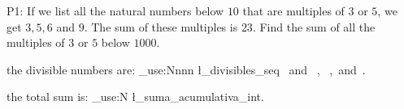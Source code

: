 \documentclass{experimento}
\edef\divisibles{\seq_use:Nnnn \l_divisibles_seq {~and~} {,~} {,~and~}}
\edef\suma{\int_use:N \l_suma_acumulativa_int}
\begin{document}
  P1: If we list all the natural numbers below $10$ that are multiples of $3$ or $5$,
  we get $3, 5, 6$ and $9$. The sum of these multiples is $23$.
  Find the sum of all the multiples of $3$ or $5$ below $1000$. \par

  the divisible numbers are: \divisibles. \par

  the total sum is: \suma. \par
\end{document}
